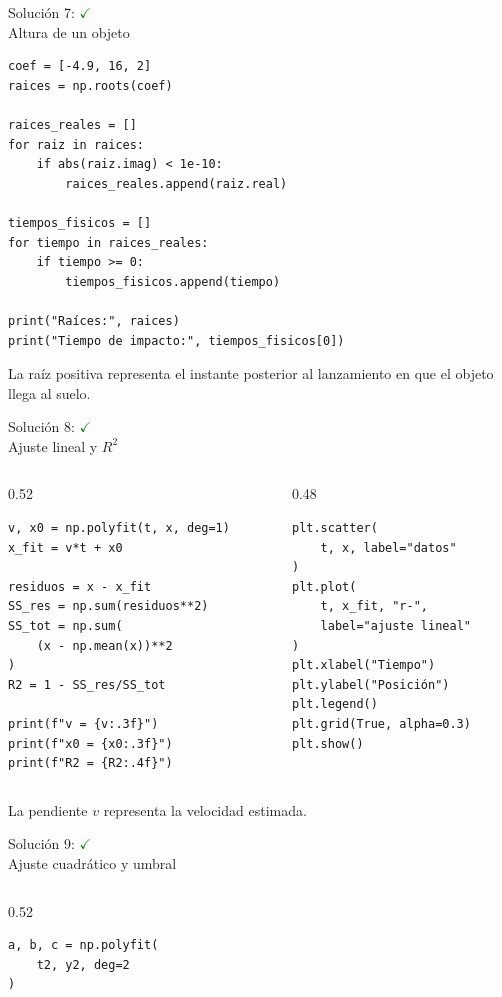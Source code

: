 \documentclass[10pt]{beamer}
\begin{document}
\begin{solutionblock}
\begin{frame}[fragile]{Solución 7: \hfill \textcolor{green}{$\checkmark$} \\ Altura de un objeto}
\begin{verbatim}
coef = [-4.9, 16, 2]
raices = np.roots(coef)

raices_reales = []
for raiz in raices:
    if abs(raiz.imag) < 1e-10:
        raices_reales.append(raiz.real)

tiempos_fisicos = []
for tiempo in raices_reales:
    if tiempo >= 0:
        tiempos_fisicos.append(tiempo)

print("Raíces:", raices)
print("Tiempo de impacto:", tiempos_fisicos[0])
\end{verbatim}

  La raíz positiva representa el instante posterior al lanzamiento en que el objeto llega al suelo.
\end{frame}

\begin{frame}[fragile]{Solución 8: \hfill \textcolor{green}{$\checkmark$} \\ Ajuste lineal y \(R^2\)}
\begin{columns}
\begin{column}{0.52\textwidth}
\begin{verbatim}
v, x0 = np.polyfit(t, x, deg=1)
x_fit = v*t + x0

residuos = x - x_fit
SS_res = np.sum(residuos**2)
SS_tot = np.sum(
    (x - np.mean(x))**2
)
R2 = 1 - SS_res/SS_tot

print(f"v = {v:.3f}")
print(f"x0 = {x0:.3f}")
print(f"R2 = {R2:.4f}")
\end{verbatim}
\end{column}
\begin{column}{0.48\textwidth}
\begin{verbatim}
plt.scatter(
    t, x, label="datos"
)
plt.plot(
    t, x_fit, "r-",
    label="ajuste lineal"
)
plt.xlabel("Tiempo")
plt.ylabel("Posición")
plt.legend()
plt.grid(True, alpha=0.3)
plt.show()
\end{verbatim}
\end{column}
\end{columns}

  La pendiente \(v\) representa la velocidad estimada.
\end{frame}

\begin{frame}[fragile]{Solución 9: \hfill \textcolor{green}{$\checkmark$} \\ Ajuste cuadrático y umbral}
\begin{columns}
\begin{column}{0.52\textwidth}
\begin{verbatim}
a, b, c = np.polyfit(
    t2, y2, deg=2
)


\end{verbatim}
\end{column}
\end{columns}
\end{frame}
\end{solutionblock}
\end{document}
